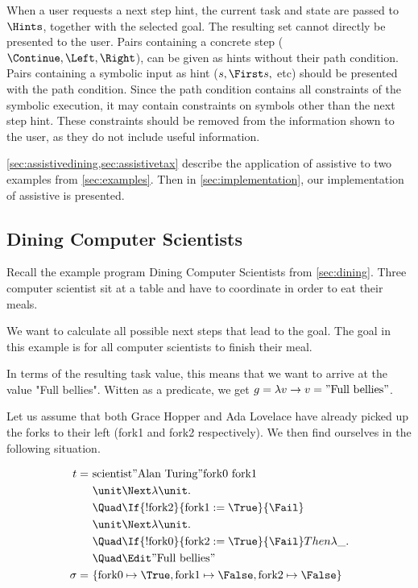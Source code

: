 
When a user requests a next step hint, the current task and state are passed to $\Hints$, together with the selected goal.
The resulting set cannot directly be presented to the user.
Pairs containing a concrete step ($\Continue,\Left,\Right$), can be given as hints without their path condition.
Pairs containing a symbolic input as hint ($s,\First s,$ etc) should be presented with the path condition.
Since the path condition contains all constraints of the symbolic execution, it may contain constraints on symbols other than the next step hint.
These constraints should be removed from the information shown to the user, as they do not include useful information.



\cref{sec:assistivedining,sec:assistivetax} describe the application of assistive \TOPHAT to two examples from \cref{sec:examples}.
Then in \cref{sec:implementation}, our implementation of assistive \TOPHAT is presented.

\subsection{Dining Computer Scientists}
\label{sec:assistivedining}

Recall the example program Dining Computer Scientists from \cref{sec:dining}.
Three computer scientist sit at a table and have to coordinate in order to eat their meals.

We want to calculate all possible next steps that lead to the goal.
The goal in this example is for all computer scientists to finish their meal.

In terms of the resulting task value, this means that we want to arrive at the value "Full bellies".
Witten as a predicate, we get $g=\lambda v\rightarrow v = "\text{Full bellies}"$.

Let us assume that both Grace Hopper and Ada Lovelace have already picked up the forks to their left (fork1 and fork2 respectively).
We then find ourselves in the following situation.


\begin{align*}
t =\ &\text{scientist} "\text{Alan Turing}" \text{fork0}\ \text{fork1} \And\\
    &\unit \Next \lambda \unit .\\
    &\Quad \If{!\text{fork2}}{\text{fork1} := \True}{\Fail} \And\\
    &\unit \Next \lambda \unit .\\
    &\Quad \If{!\text{fork0}}{\text{fork2} := \True}{\Fail} Then \lambda \_.\\
    &\Quad \Edit "\text{Full bellies}"\\
\sigma =\ &\{\text{fork0}\mapsto \True, \text{fork1}\mapsto \False,\text{fork2}\mapsto \False\}
\end{align*}

